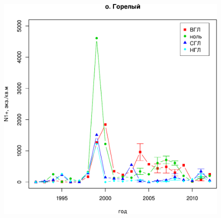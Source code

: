\begin{figure}[p]
\begin{minipage}[b]{.49\linewidth}
\begin{center}
	\end{center}
	\end{minipage}
	\hfil %
	\begin{minipage}[b]{.49\linewidth}
	\begin{center}
		\includegraphics[width=\linewidth]{../White_Sea/Luvenga_Goreliy/Goreliy_N_oneyear1.pdf}
	\end{center}
	\end{minipage}




\end{figure}
